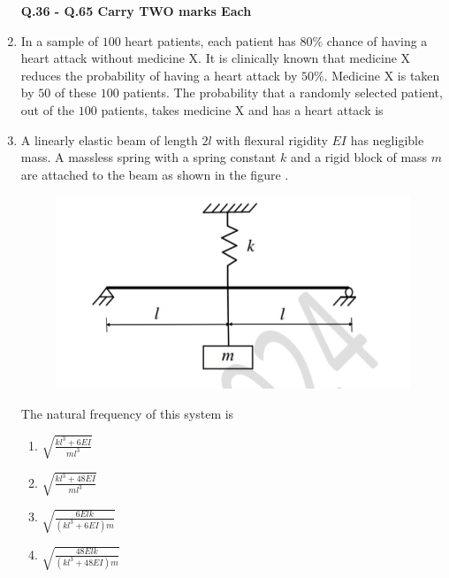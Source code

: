 \documentclass[journal,12pt,onecolumn]{article}
\theoremstyle{remark}
\begin{document}
\begin{enumerate}
\textbf{Q.36 - Q.65 Carry TWO marks Each}

    \item In a sample of $100$ heart patients, each patient has $80\%$ chance of having a heart
    attack without medicine X. It is clinically known that medicine X reduces the
    probability of having a heart attack by $50\%$. Medicine X is taken by $50$ of these $100$
    patients. The probability that a randomly selected patient, out of the $100$ patients,
    takes medicine X and has a heart attack is
    
    \hfill{}
    \begin{enumerate}
    \end{enumerate}

    \item A linearly elastic beam of length $2l$ with flexural rigidity $EI$ has negligible mass.
    A massless spring with a spring constant $k$ and a rigid block of mass $m$ are attached
    to the beam as shown in the figure .
    \begin{figure}[H]
        \centering
        \includegraphics[width=0.7\columnwidth]{figs/2Q37.jpg}
        \caption{}
        \label{fig:q37}
    \end{figure}
    The natural frequency of this system is
    
    \hfill{}
    \begin{enumerate}
        \item $\sqrt{\frac{kl^3 + 6EI}{ml^3}}$
        \item $\sqrt{\frac{kl^3 + 48EI}{ml^3}}$
        \item $\sqrt{\frac{6Elk}{(kl^3 + 6EI)m}}$
        \item $\sqrt{\frac{48Elk}{(kl^3 + 48EI)m}}$
    \end{enumerate}


\end{enumerate}
\end{document}
